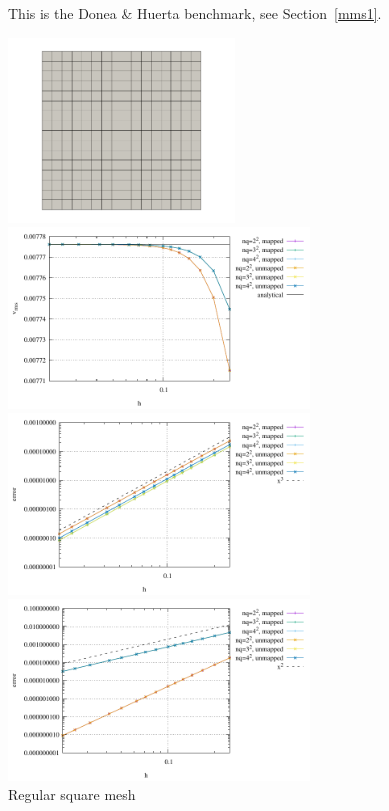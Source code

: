 This is the Donea \& Huerta benchmark, see Section~\ref{mms1}.

\begin{center}
\includegraphics[width=6cm]{python_codes/fieldstone_76/results/dh/reg/mesh_reg}
\includegraphics[width=8cm]{python_codes/fieldstone_76/results/dh/reg/vrms}\\
\includegraphics[width=8cm]{python_codes/fieldstone_76/results/dh/reg/errors_V}
\includegraphics[width=8cm]{python_codes/fieldstone_76/results/dh/reg/errors_P}\\
{\captionfont Regular square mesh}
\end{center}

